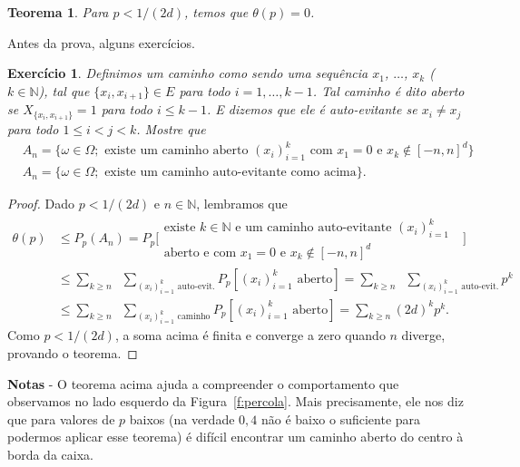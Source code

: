 \documentclass[reqno, draft]{book}
\newcommand*\1{\mathds{1}}
\newtheorem{theorem}{Teorema}[section]
\newtheorem{exercise}[example]{Exercício}
\begin{document}
\begin{theorem}
  Para $p < 1/(2d)$, temos que $\theta(p) = 0$.
\end{theorem}

Antes da prova, alguns exercícios.

\begin{exercise}
  Definimos um caminho como sendo uma sequência $x_1$, $\dots$, $x_k$ ($k \in \mathbb{N}$), tal que $\{x_i, x_{i+1}\} \in E$ para todo $i = 1, \dots, k-1$.
  Tal caminho é dito aberto se $X_{\{x_i, x_{i+1}\}} = 1$ para todo $i \leq k-1$.
  E dizemos que ele é auto-evitante se $x_i \neq x_j$ para todo $1 \leq i < j < k$.
  Mostre que
  \begin{equation*}
    \begin{split}
      & A_n = \Big\{ \omega \in \Omega; \text{ existe um caminho aberto $(x_i)_{i=1}^{k}$ com $x_1 = 0$ e $x_k \not \in [-n, n]^d$} \Big\}\\
      & A_n = \big\{ \omega \in \Omega; \text{ existe um caminho auto-evitante como acima} \big\}.
    \end{split}
  \end{equation*}
\end{exercise}

\begin{proof}
  Dado $p < 1/(2d)$ e $n \in \mathbb{N}$, lembramos que
  \begin{equation*}
    \begin{split}
      \theta(p) & \leq P_p(A_n) = P_p \Big[
      \begin{array}{c}
      \text{existe $k \in \mathbb{N}$ e um caminho auto-evitante $(x_i)_{i=1}^k$ }\\
      \text{aberto e com $x_1 = 0$ e $x_k \not \in [-n, n]^d$}
    \end{array} \Big]\\[2mm]
    & \leq \sum_{k \geq n} \; \; \sum_{(x_i)_{i=1}^k \text{ auto-evit.}} P_p [(x_i)_{i=1}^k \text{ aberto}] = \sum_{k \geq n} \; \; \sum_{(x_i)_{i=1}^k \text{ auto-evit.}} p^k\\
    & \leq \sum_{k \geq n} \; \; \sum_{(x_i)_{i=1}^k \text{ caminho}} P_p [(x_i)_{i=1}^k \text{ aberto}] = \sum_{k \geq n} (2d)^k p^k.
    \end{split}
  \end{equation*}
  Como $p < 1/(2d)$, a soma acima é finita e converge a zero quando $n$ diverge, provando o teorema.
\end{proof}

{\bf Notas} - O teorema acima ajuda a compreender o comportamento que observamos no lado esquerdo da Figura~\ref{f:percola}.
Mais precisamente, ele nos diz que para valores de $p$ baixos (na verdade $0,4$ não é baixo o suficiente para podermos aplicar esse teorema) é difícil encontrar um caminho aberto do centro à borda da caixa.
\end{document}
